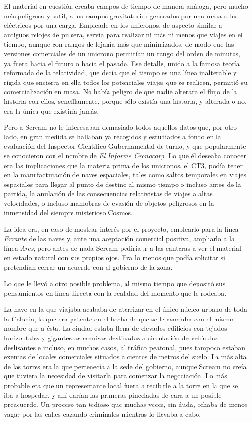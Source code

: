 El material en cuestión creaba campos de tiempo de manera análoga, pero mucho más peligrosa y sutil, a los campos gravitatorios generados por una masa o los eléctricos por una carga. Empleado en los unicronos, de aspecto similar a antiguos relojes de pulsera, servía para realizar ni más ni menos que viajes en el tiempo, aunque con rangos de lejanía más que minimizados, de modo que las versiones comerciales de un unicrono permitían un rango del orden de minutos, ya fuera hacia el futuro o hacia el pasado. Ese detalle, unido a la famosa teoría reformada de la relatividad, que decía que el tiempo es una línea inalterable y rígida que encierra en ella todos los potenciales viajes que se realicen, permitió su comercialización en masa. No había peligro de que nadie alterara el flujo de la historia con ellos, sencillamente, porque sólo existía una historia, y alterada o no, era la única que existiría jamás.

Pero a Scream no le interesaban demasiado todos aquellos datos que, por otro lado, en gran medida se hallaban ya recogidos y estudiados a fondo en la evaluación del Inspector Científico Gubernamental de turno, y que popularmente se conocieron con el nombre de \emph{El Informe Cronocorp}. Lo que él deseaba conocer era las implicaciones que la materia prima de los unicronos, el CT3, podía tener en la manufacturación de naves espaciales, tales como saltos temporales en viajes espaciales para llegar al punto de destino al mismo tiempo o incluso antes de la partida, la anulación de las consecuencias relativistas de viajes a altas velocidades, o incluso maniobras de evasión de objetos peligrosos en la inmensidad del siempre misterioso Cosmos.

La idea era, en caso de mostrar interés por el proyecto, emplearlo para la línea \emph{Errante} de las naves y, ante una aceptación comercial positiva, ampliarlo a la línea \emph{Ares}, pero antes de nada Scream pediría ir a las canteras a ver el material en estado natural con sus propios ojos. Era lo menos que podía solicitar si pretendían cerrar un acuerdo con el gobierno de la zona.

Lo que le llevó a otro posible problema, al mismo tiempo que depositó sus pensamientos en línea directa con la realidad del momento que le rodeaba.

La nave en la que viajaba acababa de aterrizar en el único núcleo urbano de toda la Colonia, lo que era patente en el hecho de que se le asociaba con el mismo nombre que a ésta. La ciudad estaba llena de elevados edificios con tejados horizontales y gigantescas cornisas destinadas a circulación de vehículos deslizantes e incluso, en muchos casos, al tráfico peatonal, pues tampoco estaban exentas de locales comerciales situados a cientos de metros del suelo. La más alta de las torres era la que pertenecía a la sede del gobierno, aunque Scream no creía que tuviera la necesidad de visitarla para comenzar la negociación. Lo más probable era que un representante local fuera a recibirle a la torre en la que se iba a hospedar, y allí darían las primeras pinceladas de cara a un posible preacuerdo. Un proceso tan tedioso que muchas veces, sin duda, echaba de menos vagar por las calles cazando criminales mientras lo llevaba a cabo.

